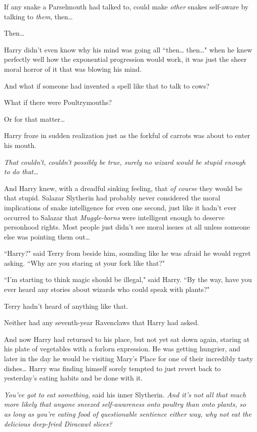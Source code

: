 If any snake a Parselmouth had talked to, could make \emph{other} snakes self-aware by talking to \emph{them}, then{\ldots}

Then{\ldots}

Harry didn't even know why his mind was going all ``then{\ldots} then{\ldots}" when he knew perfectly well how the exponential progression would work, it was just the sheer moral horror of it that was blowing his mind.

And what if someone had invented a spell like that to talk to cows?

What if there were Poultrymouths?

Or for that matter{\ldots}

Harry froze in sudden realization just as the forkful of carrots was about to enter his mouth.

\emph{That couldn't, couldn't possibly be true, surely no wizard would be stupid enough to do \emph{that{\ldots}}}

And Harry knew, with a dreadful sinking feeling, that \emph{of course} they would be that stupid. Salazar Slytherin had probably never considered the moral implications of snake intelligence for even one second, just like it hadn't ever occurred to Salazar that \emph{Muggle-borns} were intelligent enough to deserve personhood rights. Most people just didn't see moral issues at all unless someone else was pointing them out{\ldots}

``Harry?" said Terry from beside him, sounding like he was afraid he would regret asking. ``Why are you staring at your fork like that?"

``I'm starting to think magic should be illegal," said Harry. ``By the way, have you ever heard any stories about wizards who could speak with plants?"

\later

Terry hadn't heard of anything like that.

Neither had any seventh-year Ravenclaws that Harry had asked.

And now Harry had returned to his place, but not yet sat down again, staring at his plate of vegetables with a forlorn expression. He was getting hungrier, and later in the day he would be visiting Mary's Place for one of their incredibly tasty dishes{\ldots} Harry was finding himself sorely tempted to just revert back to yesterday's eating habits and be done with it.

\emph{You've got to eat something,} said his inner Slytherin. \emph{And it's not all that much \emph{more} likely that anyone sneezed self-awareness onto poultry than onto plants, so as long as you're eating food of questionable sentience either way, why not eat the delicious deep-fried Diracawl slices?}

